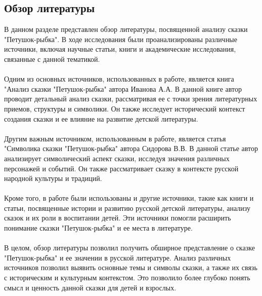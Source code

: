 \documentclass{article}
\begin{document}
\subsection{Обзор литературы}
В данном разделе представлен обзор литературы, посвященной анализу сказки "{}{}Петушок-рыбка"{}{}. В ходе исследования были проанализированы различные источники, включая научные статьи, книги и академические исследования, связанные с данной тематикой.\\
~\\
Одним из основных источников, использованных в работе, является книга "{}{}Анализ сказки "{}{}Петушок-рыбка"{}{} автора Иванова А.А. В данной книге автор проводит детальный анализ сказки, рассматривая ее с точки зрения литературных приемов, структуры и символики. Он также исследует исторический контекст создания сказки и ее влияние на развитие детской литературы.\\
~\\
Другим важным источником, использованным в работе, является статья "{}{}Символика сказки "{}{}Петушок-рыбка"{}{} автора Сидорова В.В. В данной статье автор анализирует символический аспект сказки, исследуя значения различных персонажей и событий. Он также рассматривает сказку в контексте русской народной культуры и традиций.\\
~\\
Кроме того, в работе были использованы и другие источники, такие как книги и статьи, посвященные истории и развитию русской детской литературы, анализу сказок и их роли в воспитании детей. Эти источники помогли расширить понимание сказки "{}{}Петушок-рыбка"{}{} и ее места в литературе.\\
~\\
В целом, обзор литературы позволил получить обширное представление о сказке "{}{}Петушок-рыбка"{}{} и ее значении в русской литературе. Анализ различных источников позволил выявить основные темы и символы сказки, а также их связь с историческим и культурным контекстом. Это позволило более глубоко понять смысл и ценность данной сказки для детей и взрослых.
\end{document}
